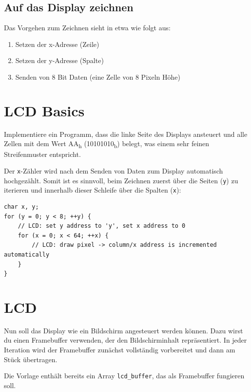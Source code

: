 \subsection*{Auf das Display zeichnen}

Das Vorgehen zum Zeichnen sieht in etwa wie folgt aus:
\begin{enumerate}
	\item Setzen der x-Adresse (Zeile)
	\item Setzen der y-Adresse (Spalte)
	\item Senden von 8 Bit Daten (eine \glqq{}Zelle\grqq{} von 8 Pixeln Höhe)
\end{enumerate}



\section{LCD Basics}
Implementiere ein Programm, dass die linke Seite des Displays ansteuert und alle Zellen mit dem Wert AA\textsubscript{h} (10101010\textsubscript{b}) belegt, was einem sehr feinen Streifenmuster entspricht.

Der \texttt{x}-Zähler wird nach dem Senden von Daten zum Display automatisch hochgezählt.
Somit ist es sinnvoll, beim Zeichnen zuerst über die Seiten (\texttt{y}) zu iterieren und innerhalb dieser Schleife über die Spalten (\texttt{x}):
\begin{lstlisting}
char x, y;
for (y = 0; y < 8; ++y) {
	// LCD: set y address to 'y', set x address to 0
	for (x = 0; x < 64; ++x) {
	    // LCD: draw pixel -> column/x address is incremented automatically
	}
}
\end{lstlisting}




\section{LCD}
Nun soll das Display wie ein Bildschirm angesteuert werden können.
Dazu wirst du einen Framebuffer verwenden, der den Bildschirminhalt repräsentiert.
In jeder Iteration wird der Framebuffer zunächst vollständig vorbereitet und dann am Stück übertragen.

Die Vorlage enthält bereits ein Array \texttt{lcd\_buffer}, das als Framebuffer fungieren soll.

